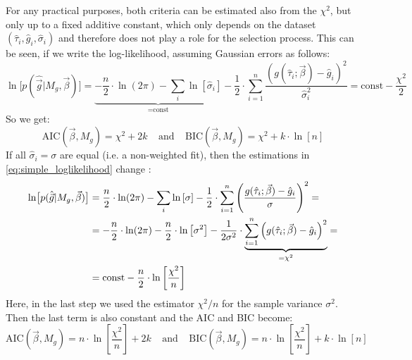 \documentclass[a4paper,notitlepage]{article}
\begin{document}
For any practical purposes, both criteria can be estimated also from the $\chi^2$, but only up to a fixed additive constant, which only depends on the dataset $(\hat{\tau}_i, \hat{g}_i, \hat{\sigma}_i)$ and therefore does not play a role for the selection process. This can be seen, if we write the log-likelihood, assuming Gaussian errors as follows:
\begin{equation}\label{eq:simple_loglikelihood}
  \ln\bigl[p(\hat{\vec{g}}|M_g,\vec{\beta})\bigr]=\underbrace{-\frac{n}{2}\cdot\ln(2\pi)-\sum\limits_i\ln\left[\hat{\sigma}_i\right]}_{=\text{const}}-\frac{1}{2}\cdot\sum\limits_{i=1}^n\frac{\left(g(\hat{\tau}_i;\vec{\beta})-\hat{g}_i\right)^2}{\hat{\sigma}_i^2}%
  =\text{const}-\frac{\chi^2}{2}
\end{equation}
So we get:
\begin{equation}\label{eq:aic_bic_chi2}
  \mbox{AIC}(\vec{\beta},M_g)=\chi^2+2k\ \ \ \ \ \text{and}\ \ \ \ \ \mbox{BIC}(\vec{\beta},M_g)=\chi^2+k\cdot\ln [n]
\end{equation}
If all $\hat{\sigma}_i=\sigma$ are equal  (i.e. a non-weighted fit), then the estimations in \eqref{eq:simple_loglikelihood} change \cite{BURNHA2002}:
\begin{align}\label{eq:simple_loglikelihood_equalvar}
  \ln\bigl[p(\hat{\vec{g}}|M_g,\vec{\beta})\bigr]&=\-\frac{n}{2}\cdot\ln(2\pi)-\sum\limits_i\ln\left[\sigma\right]-\frac{1}{2}\cdot\sum\limits_{i=1}^n\left(\frac{g(\hat{\tau}_i;\vec{\beta})-\hat{g}_i}{\sigma}\right)^2=\\
  &=-\frac{n}{2}\cdot\ln(2\pi)-\frac{n}{2}\cdot\ln\left[\sigma^2\right]-\frac{1}{2\sigma^2}\cdot\underbrace{\sum\limits_{i=1}^n\left(g(\hat{\tau}_i;\vec{\beta})-\hat{g}_i\right)^2}_{=\chi^2}=\\
  &=\text{const}-\frac{n}{2}\cdot\ln\left[\frac{\chi^2}{n}\right]
\end{align}
Here, in the last step we used the estimator $\chi^2/n$ for the sample variance $\sigma^2$. Then the last term is also constant and the AIC and BIC become:
\begin{equation}\label{eq:aic_bic_chi2_equalsigma}
  \mbox{AIC}(\vec{\beta},M_g)=n\cdot\ln\left[\frac{\chi^2}{n}\right]+2k\ \ \ \ \ \text{and}\ \ \ \ \ \mbox{BIC}(\vec{\beta},M_g)=n\cdot\ln\left[\frac{\chi^2}{n}\right]+k\cdot\ln [n]
\end{equation}
\end{document}
